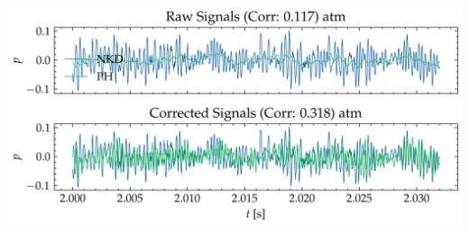 \documentclass[aspectratio=169,10pt]{beamer}
\begin{document}
\begin{frame}
\begin{columns}[c]
            \includegraphics[width=0.6\linewidth]{../figures/cali_09/PH-NKD/ph_recon_atm_npsg256.png}
    \end{columns}
\end{frame}

    
    


            




\end{document}
